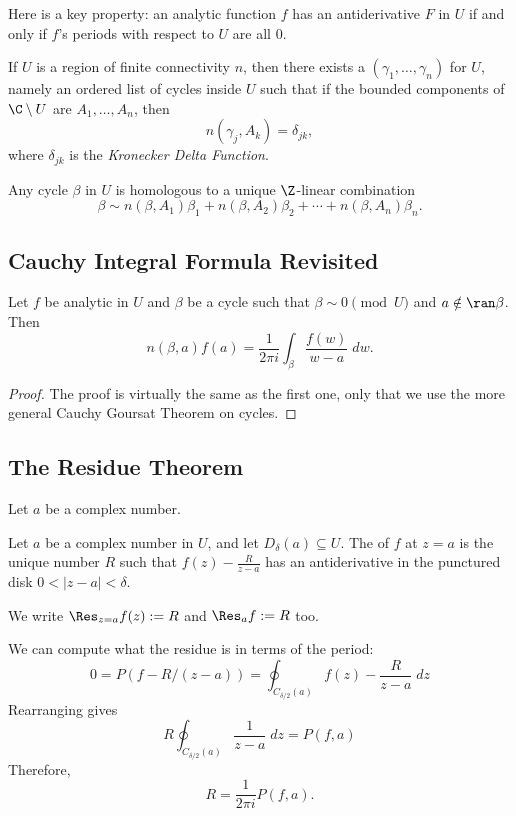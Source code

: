 Here is a key property: an analytic function $f$ has an antiderivative $F$
in $U$ if and only if $f$'s periods with respect to $U$ are all $0$.

\begin{theorem}
    If $U$ is a region of finite connectivity $n$, then there exists
    a  $(\gamma_1, \ldots, \gamma_n)$ for $U$,
    namely an ordered list of cycles inside $U$ such that if the
    bounded components of $\C \setminus U$ are $A_1, \ldots, A_n$,
    then
    \[ n(\gamma_j, A_k) = \delta_{jk}, \]
    where $\delta_{jk}$ is the \textit{Kronecker Delta Function}.
\end{theorem}

\begin{theorem}
    Any cycle $\beta$ in $U$ is homologous to a unique $\Z$-linear
    combination
    \[ \beta \sim n(\beta, A_1)\beta_1 + n(\beta, A_2)\beta_2 + \cdots
    + n(\beta, A_n)\beta_n. \]
\end{theorem}

\subsection{Cauchy Integral Formula Revisited}
\begin{theorem}
    Let $f$ be analytic in $U$ and $\beta$ be a cycle such that $\beta
    \sim 0 \pmod{U}$ and $a \notin \ran \beta$.
    Then
    \[ n(\beta, a)f(a) = \frac{1}{2\pi i} \int_{\beta} \frac{f(w)}{w-a}
    \; dw. \]
\end{theorem}

\begin{proof}
    The proof is virtually the same as the first one, only that we use
    the more general Cauchy Goursat Theorem on cycles.
\end{proof}

\subsection{The Residue Theorem}
Let $a$ be a complex number.
\begin{definition}
    Let $a$ be a complex number in $U$, and let $D_{\delta}(a) \subseteq U$.
    The  of $f$ at $z=a$ is the unique number $R$ such that
    $f(z) - \frac{R}{z-a}$ has an antiderivative in the punctured disk
    $0 < |z-a| < \delta$.

    We write $\Res_{z=a} f(z) := R$ and $\Res_a f := R$ too.
\end{definition}
We can compute what the residue is in terms of the period:
\[ 0 = P(f - R/(z-a)) = \oint_{C_{\delta/2}(a)} f(z) - \frac{R}{z-a} \; dz \]
Rearranging gives
\[ R \oint_{C_{\delta/2}(a)} \frac{1}{z-a} \; dz = P(f, a) \]
Therefore,
\[ R = \frac{1}{2\pi i} P(f, a). \]


